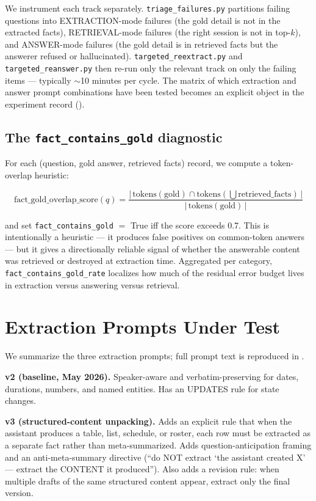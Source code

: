 \documentclass{article}
\begin{document}
We instrument each track separately. \texttt{triage\_failures.py} partitions failing questions into EXTRACTION-mode failures (the gold detail is not in the extracted facts), RETRIEVAL-mode failures (the right session is not in top-$k$), and ANSWER-mode failures (the gold detail is in retrieved facts but the answerer refused or hallucinated). \texttt{targeted\_reextract.py} and \texttt{targeted\_reanswer.py} then re-run only the relevant track on only the failing items --- typically $\sim$10 minutes per cycle. The matrix of which extraction and answer prompt combinations have been tested becomes an explicit object in the experiment record ().

\subsection{The \texttt{fact\_contains\_gold} diagnostic}
\label{sec:factgold}

For each (question, gold answer, retrieved facts) record, we compute a token-overlap heuristic:

\begin{equation}
\text{fact\_gold\_overlap\_score}(q) = \frac{|\,\text{tokens}(\text{gold}) \cap \text{tokens}(\bigcup \text{retrieved\_facts})\,|}{|\,\text{tokens}(\text{gold})\,|}
\label{eq:factgold}
\end{equation}

and set \texttt{fact\_contains\_gold} $= $ True iff the score exceeds 0.7. This is intentionally a heuristic --- it produces false positives on common-token answers --- but it gives a directionally reliable signal of whether the answerable content was retrieved or destroyed at extraction time. Aggregated per category, \texttt{fact\_contains\_gold\_rate} localizes how much of the residual error budget lives in extraction versus answering versus retrieval.

\section{Extraction Prompts Under Test}
\label{sec:prompts}

We summarize the three extraction prompts; full prompt text is reproduced in .

\textbf{v2 (baseline, May 2026).} Speaker-aware and verbatim-preserving for dates, durations, numbers, and named entities. Has an UPDATES rule for state changes.

\textbf{v3 (structured-content unpacking).} Adds an explicit rule that when the assistant produces a table, list, schedule, or roster, each row must be extracted as a separate fact rather than meta-summarized. Adds question-anticipation framing and an anti-meta-summary directive (``do NOT extract `the assistant created X' --- extract the CONTENT it produced''). Also adds a revision rule: when multiple drafts of the same structured content appear, extract only the final version.
\end{document}
